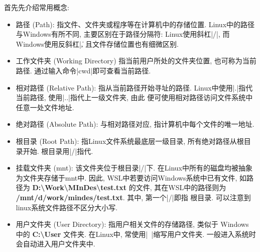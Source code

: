 首先先介绍常用概念:
\begin{itemize}
      \item 路径 (Path): 指文件、文件夹或程序等在计算机中的存储位置. Linux中的路径与Windows有所不同, 主要区别在于路径分隔符:
            Linux使用斜杠\cverb|/|, 而Windows使用反斜杠\cverb|\|, 且文件存储位置也有细微区别.
      \item 工作文件夹 (Working Directory) 指当前用户所处的文件夹位置, 也可称为当前路径. 通过输入命令\cverb|cwd|即可查看当前路径.
      \item 相对路径 (Relative Path): 指从当前路径开始寻址的路径. Linux中使用\cverb|.|指代当前路径, 使用\cverb|..|指代上一级文件夹, 由此
            便可使用相对路径访问文件系统中任意一处文件地址.
      \item 绝对路径 (Absolute Path): 与相对路径对应, 指计算机中每个文件的唯一地址.
      \item 根目录 (Root Path): 指Linux文件系统最底层一级目录, 所有绝对路径从根目录开始. 根目录用\cverb|/|指代.
      \item 挂载文件夹 (mnt): 该文件夹位于根目录\cverb|/|下. 在Linux中所有的磁盘均被抽象为文件夹存储于mnt中.
            因此, WSL中若要访问Windows系统中已有文件, 如路径为 \textbf{D:\textbackslash{}Work\textbackslash{}MInDes\textbackslash{}test.txt}
            的文件, 其在WSL中的路径则为 \textbf{/mnt/d/work/mindes/test.txt}. 其中, 第一个\cverb|/|即指
            根目录. 可以注意到linux系统文件路径不区分大小写.
      \item 用户文件夹 (User Directory): 指用户相关文件的存储路径, 类似于 Windows 中的 \textbf{C:\textbackslash{}User} 文件夹. 在Linux中,
            常使用\cverb|~|缩写用户文件夹. 一般进入系统时会自动进入用户文件夹中.
\end{itemize}

